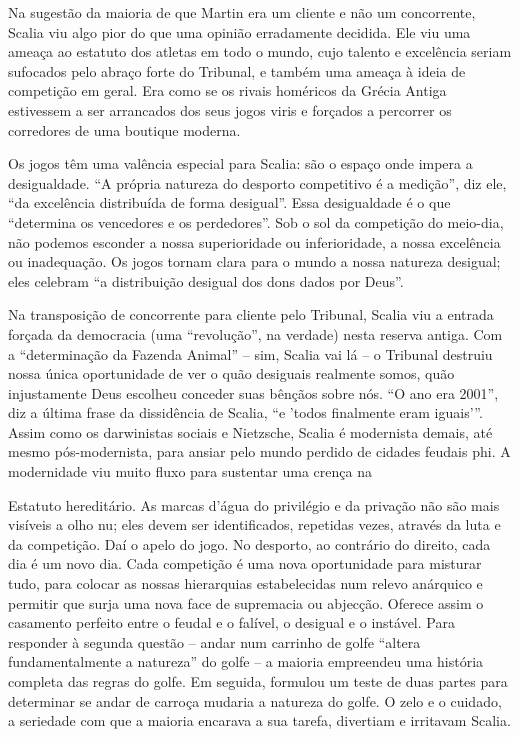  \par 
Na sugestão da maioria de que Martin era um cliente e não um concorrente, Scalia viu algo pior do que uma opinião erradamente decidida. Ele viu uma ameaça ao estatuto dos atletas em todo o mundo, cujo talento e excelência seriam sufocados pelo abraço forte do Tribunal, e também uma ameaça à ideia de competição em geral. Era como se os rivais homéricos da Grécia Antiga estivessem a ser arrancados dos seus jogos viris e forçados a percorrer os corredores de uma boutique moderna.
 \par 
Os jogos têm uma valência especial para Scalia: são o espaço onde impera a desigualdade. “A própria natureza do desporto competitivo é a medição”, diz ele, “da excelência distribuída de forma desigual”. Essa desigualdade é o que “determina os vencedores e os perdedores”. Sob o sol da competição do meio-dia, não podemos esconder a nossa superioridade ou inferioridade, a nossa excelência ou inadequação. Os jogos tornam clara para o mundo a nossa natureza desigual; eles celebram “a distribuição desigual dos dons dados por Deus”.
 \par 
Na transposição de concorrente para cliente pelo Tribunal, Scalia viu a entrada forçada da democracia (uma “revolução”, na verdade) nesta reserva antiga. Com a “determinação da Fazenda Animal” – sim, Scalia vai lá – o Tribunal destruiu nossa única oportunidade de ver o quão desiguais realmente somos, quão injustamente Deus escolheu conceder suas bênçãos sobre nós. “O ano era 2001”, diz a última frase da dissidência de Scalia, “e 'todos finalmente eram iguais'”. Assim como os darwinistas sociais e Nietzsche, Scalia é modernista demais, até mesmo pós-modernista, para ansiar pelo mundo perdido de cidades feudais phi. A modernidade viu muito fluxo para sustentar uma crença na
 \par 
Estatuto hereditário. As marcas d'água do privilégio e da privação não são mais visíveis a olho nu; eles devem ser identificados, repetidas vezes, através da luta e da competição. Daí o apelo do jogo. No desporto, ao contrário do direito, cada dia é um novo dia. Cada competição é uma nova oportunidade para misturar tudo, para colocar as nossas hierarquias estabelecidas num relevo anárquico e permitir que surja uma nova face de supremacia ou abjecção. Oferece assim o casamento perfeito entre o feudal e o falível, o desigual e o instável. Para responder à segunda questão – andar num carrinho de golfe “altera fundamentalmente a natureza” do golfe – a maioria empreendeu uma história completa das regras do golfe. Em seguida, formulou um teste de duas partes para determinar se andar de carroça mudaria a natureza do golfe. O zelo e o cuidado, a seriedade com que a maioria encarava a sua tarefa, divertiam e irritavam Scalia.
